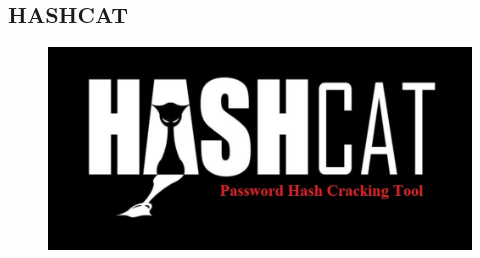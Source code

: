 \documentclass[10pt,oneside,english,a4paper]{article}
\begin{document}
\clearpage
\subsection{HASHCAT}
\begin{figure}[h]
	\centering
	\includegraphics[scale = 0.20]{Hashcat.png}
\end{figure}
\end{document}
